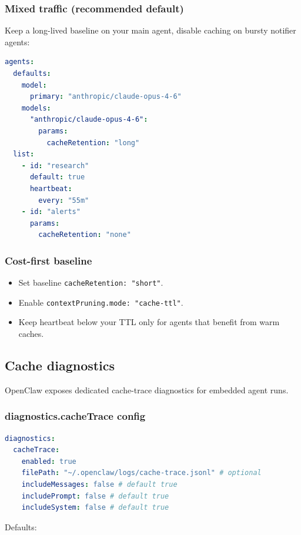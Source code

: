 \subsubsection{Mixed traffic (recommended default)}


Keep a long-lived baseline on your main agent, disable caching on bursty notifier agents:

\begin{lstlisting}[language=yaml]
agents:
  defaults:
    model:
      primary: "anthropic/claude-opus-4-6"
    models:
      "anthropic/claude-opus-4-6":
        params:
          cacheRetention: "long"
  list:
    - id: "research"
      default: true
      heartbeat:
        every: "55m"
    - id: "alerts"
      params:
        cacheRetention: "none"
\end{lstlisting}


\subsubsection{Cost-first baseline}


\begin{itemize}
  \item Set baseline \texttt{cacheRetention: "short"}.
  \item Enable \texttt{contextPruning.mode: "cache-ttl"}.
  \item Keep heartbeat below your TTL only for agents that benefit from warm caches.
\end{itemize}


\subsection{Cache diagnostics}


OpenClaw exposes dedicated cache-trace diagnostics for embedded agent runs.

\subsubsection{diagnostics.cacheTrace config}


\begin{lstlisting}[language=yaml]
diagnostics:
  cacheTrace:
    enabled: true
    filePath: "~/.openclaw/logs/cache-trace.jsonl" # optional
    includeMessages: false # default true
    includePrompt: false # default true
    includeSystem: false # default true
\end{lstlisting}


Defaults:

